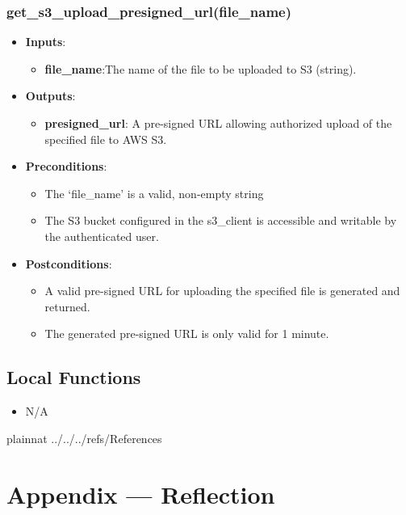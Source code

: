 \documentclass[12pt, titlepage]{article}
\begin{document}
\subsubsection{get\_s3\_upload\_presigned\_url(file\_name)}
\begin{itemize}
    \item \textbf{Inputs}:
        \begin{itemize}
            \item \textbf{file\_name}:The name of the file to be uploaded to S3 (string).
        \end{itemize}
        \item \textbf{Outputs}:
        \begin{itemize}
            \item \textbf{presigned\_url}: A pre-signed URL allowing authorized upload of the specified file to AWS S3.
        \end{itemize}
    \item \textbf{Preconditions}:
        \begin{itemize}
            \item The `file\_name' is a valid, non-empty string
            \item The S3 bucket configured in the s3\_client is accessible and writable by the authenticated user.
        \end{itemize}
    \item \textbf{Postconditions}:
        \begin{itemize}
            \item A valid pre-signed URL for uploading the specified file is generated and returned.
            \item The generated pre-signed URL is only valid for 1 minute.
        \end{itemize}
\end{itemize}


\subsection{Local Functions}
\begin{itemize}
    \item N/A
\end{itemize}


 {plainnat}
 {../../../refs/References}

\newpage


\section*{Appendix --- Reflection}
\end{document}
